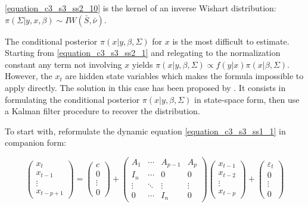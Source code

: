 \ref{equation_c3_s3_ss2_10} is the kernel of an inverse Wishart distribution: $\pi(\Sigma| y, x, \beta) \sim IW(\bar{S}, \bar{\nu})$.

The conditional posterior $\pi(x| y, \beta, \Sigma)$ for $x$ is the most difficult to estimate. Starting from \ref{equation_c3_s3_ss2_1} and relegating to the normalization constant any term not involving $x$ yields $\pi(x| y, \beta, \Sigma) \propto f(y|x) \pi(x|\beta, \Sigma)$. However, the $x_t$ are hidden state variables which makes the formula impossible to apply directly. The solution in this case has been proposed by \cite{Carter1994}. It consists in formulating the conditional posterior $\pi(x| y, \beta, \Sigma)$ in state-space form, then use a Kalman filter procedure to recover the distribution.

To start with, reformulate the dynamic equation \ref{equation_c3_s3_ss1_1} in companion form:

\begin{equation}
\left( \begin{matrix} x_{t} \\ x_{t-1} \\ \vdots \\ x_{t-p+1} \end{matrix} \right) = 
\left( \begin{matrix} c \\ 0 \\ \vdots \\ 0 \end{matrix} \right) +
\left( \begin{matrix} A_{1} & \cdots & A_{p-1} & A_{p} \\ I_n & \cdots & 0 & 0 \\ \vdots & \ddots & \vdots & \vdots \\ 0 & \cdots & I_n & 0 \end{matrix} \right)
\left( \begin{matrix} x_{t-1} \\ x_{t-2} \\ \vdots \\ x_{t-p} \end{matrix} \right) +
\left( \begin{matrix} \varepsilon_t \\ 0 \\ \vdots \\ 0 \end{matrix} \right)
\label{equation_c3_s3_ss2_11}
\end{equation}

